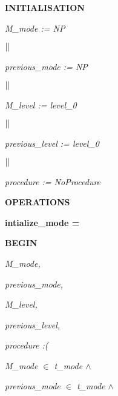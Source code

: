 \documentclass[11pt]{article}
\begin{document}
\begin{sloppypar}
\hspace*{0.20in}

\bf INITIALISATION

\hspace*{0.20in}

\hspace*{0.20in}\it M\_mode \rm := \it NP

\hspace*{0.20in} $\mbox{$\mid\mid$}$ 

\hspace*{0.20in}\it previous\_mode \rm := \it NP

\hspace*{0.20in} $\mbox{$\mid\mid$}$ 

\hspace*{0.20in}\it M\_level \rm := \it level\_0

\hspace*{0.20in} $\mbox{$\mid\mid$}$ 

\hspace*{0.20in}\it previous\_level \rm := \it level\_0

\hspace*{0.20in} $\mbox{$\mid\mid$}$ 

\hspace*{0.20in}\it procedure \rm := \it NoProcedure

\hspace*{0.20in}

\bf OPERATIONS

\hspace*{0.20in}

\hspace*{0.20in}\bf intialize\_mode \rm =

\hspace*{0.20in}\bf BEGIN

\hspace*{0.40in}\it M\_mode\rm ,

\hspace*{0.40in}\it previous\_mode\rm ,

\hspace*{0.40in}\it M\_level\rm , 

\hspace*{0.40in}\it previous\_level\rm ,

\hspace*{0.40in}\it procedure \rm :\rm (

\hspace*{0.60in}\it M\_mode  $\in$  \it t\_mode  $\land$ 

\hspace*{0.60in}\it previous\_mode  $\in$  \it t\_mode  $\land$ 


\end{sloppypar}
\end{document}
